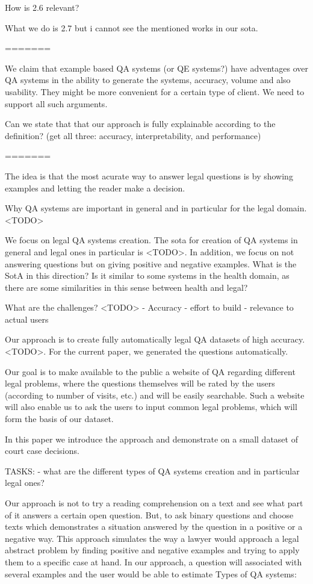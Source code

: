 How is 2.6 relevant?

What we do is 2.7 but i cannot see the mentioned works in our sota.

=======

We claim that example based QA systems (or QE systems?) have adventages over QA systems in the ability to generate the systems, accuracy, volume and also usability. They might be more convenient for a certain type of client. We need to support all such arguments.

Can we state that that our approach is fully explainable according to the definition? (get all three: accuracy, interpretability, and performance)

=======


The idea is that the most acurate way to answer legal questions is by showing examples and letting the reader make a decision.

Why QA systems are important in general and in particular for the legal domain. <TODO>

We focus on legal QA systems creation. The sota for creation of QA systems in general and legal ones in particular is <TODO>. In addition, we focus on not answering questions but on giving positive and negative examples. What is the SotA in this direction? Is it similar to some systems in the health domain, as there are some similarities in this sense between health and legal?

What are the challenges? <TODO>
- Accuracy
- effort to build
- relevance to actual users

Our approach is to create fully automatically legal QA datasets of high accuracy.<TODO>. For the current paper, we generated the questions automatically.

Our goal is to make available to the public a website of QA regarding different legal problems, where the questions themselves will be rated by the users (according to number of visits, etc.) and will be easily searchable. Such a website will also enable us to ask the users to input common legal problems, which will form the basis of our dataset.

In this paper we introduce the approach and demonstrate on a small dataset of court case decisions. 

TASKS:
- what are the different types of QA systems creation and in particular legal ones?

Our approach is not to try a reading comprehension on a text and see what part of it answers a certain open question. But, to ask binary questions and choose texts which demonstrates a situation answered by the question in a positive or a negative way. This approach simulates the way a lawyer would approach a legal abstract problem by finding positive and negative examples and trying to apply them to a specific case at hand. In our approach, a question will associated with several examples and the user would be able to estimate  
Types of QA systems:

